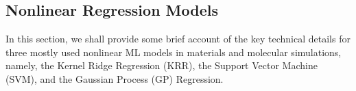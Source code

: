 \subsection{Nonlinear Regression Models}
\label{appendix:nonlinear_regression}

In this section, we shall provide some brief account of the key technical details for three mostly used nonlinear ML models in materials and molecular simulations, namely, the Kernel Ridge Regression (KRR), the Support Vector Machine (SVM),\cite{cortes1995support} and the Gaussian Process (GP) Regression.\cite{williams2006gaussian} 

